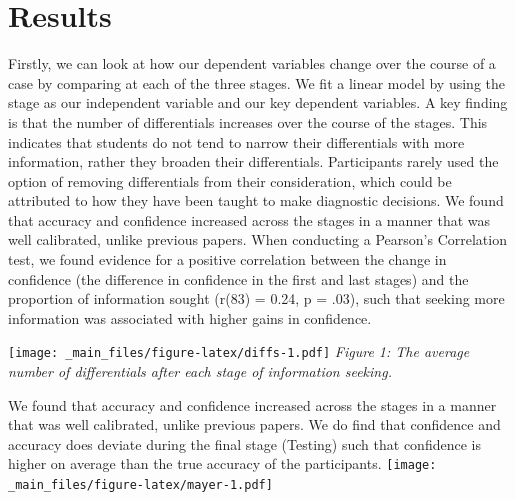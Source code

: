 \documentclass[a4paper, nobind]{templates/ociamthesis}
\begin{document}
\hypertarget{results}{%
\section*{Results}\label{results}}

Firstly, we can look at how our dependent variables change over the course of a case by comparing at each of the three stages. We fit a linear model by using the stage as our independent variable and our key dependent variables. A key finding is that the number of differentials increases over the course of the stages. This indicates that students do not tend to narrow their differentials with more information, rather they broaden their differentials. Participants rarely used the option of removing differentials from their consideration, which could be attributed to how they have been taught to make diagnostic decisions. We found that accuracy and confidence increased across the stages in a manner that was well calibrated, unlike previous papers. When conducting a Pearson's Correlation test, we found evidence for a positive correlation between the change in confidence (the difference in confidence in the first and last stages) and the proportion of information sought (r(83) = 0.24, p = .03), such that seeking more information was associated with higher gains in confidence.

\texttt{[image: \_main\_files/figure-latex/diffs-1.pdf]}
\emph{Figure 1: The average number of differentials after each stage of information seeking.}

We found that accuracy and confidence increased across the stages in a manner that was well calibrated, unlike previous papers. We do find that confidence and accuracy does deviate during the final stage (Testing) such that confidence is higher on average than the true accuracy of the participants.
\texttt{[image: \_main\_files/figure-latex/mayer-1.pdf]}
\end{document}
